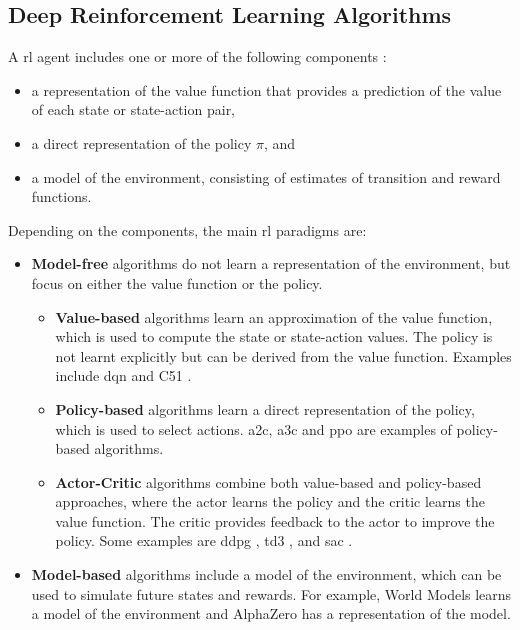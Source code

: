 \subsection{Deep Reinforcement Learning Algorithms} \label{sec:drlalgorithms}

A \acrlong{rl} agent includes one or more of the following components \cite{Francois-Lavet2018}:
\begin{itemize}
    \item a representation of the value function that provides a prediction of the value of each state or state-action pair,
    \item a direct representation of the policy $\pi$, and
    \item a model of the environment, consisting of estimates of transition and reward functions.
\end{itemize}

Depending on the components, the main \acrlong{rl} paradigms are: 
\begin{itemize}
    \item \textbf{Model-free} algorithms do not learn a representation of the environment, but focus on either the value function or the policy. 
    \begin{itemize}
        \item \textbf{Value-based} algorithms learn an approximation of the value function, which is used to compute the state or state-action values. The policy is not learnt explicitly but can be derived from the value function. Examples include \acrfull{dqn} \cite{Mnih2013} and C51 \cite{Bellemare2017}. 
        \item \textbf{Policy-based} algorithms learn a direct representation of the policy, which is used to select actions. \acrfull{a2c}, \acrfull{a3c} \cite{Mnih2016} and \acrfull{ppo} \cite{Schulman2017} are examples of policy-based algorithms.
        \item \textbf{Actor-Critic} algorithms combine both value-based and policy-based approaches, where the actor learns the policy and the critic learns the value function. The critic provides feedback to the actor to improve the policy. Some examples are \acrfull{ddpg} \cite{Lillicrap2015}, \acrfull{td3} \cite{Fujimoto2018}, and \acrfull{sac} \cite{Haarnoja2018}.
    \end{itemize}
    \item \textbf{Model-based} algorithms include a model of the environment, which can be used to simulate future states and rewards. For example, World Models \cite{HaGoogleBrainTokyo2018} learns a model of the environment and AlphaZero \cite{Silver2017} has a representation of the model. 
\end{itemize}

